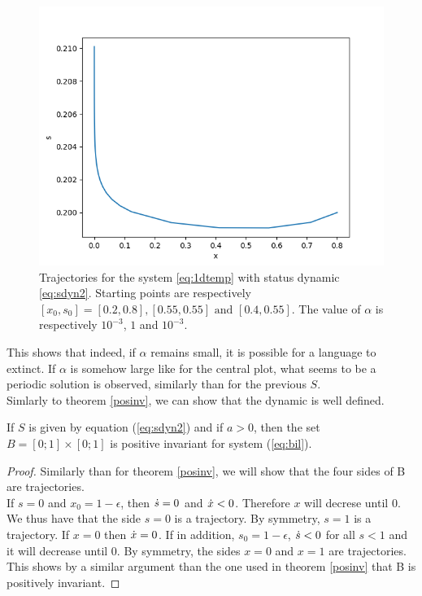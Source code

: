 \documentclass{article}
\begin{document}
\begin{figure}[H]
\includegraphics[scale=0.4]{traj1D208021e-3.png}
\caption{Trajectories for the system \ref{eq:1dtemp} with status dynamic \ref{eq:sdyn2}. Starting points are respectively $[x_0, s_0] = [0.2, 0.8], [0.55,0.55] \text{   and   } [0.4, 0.55]$. The value of $\alpha$ is respectively $10^{-3}$, $1$ and $10^{-3}$.}
\label{fig:traj1D2}
\end{figure}

This shows that indeed, if $\alpha$ remains small, it is possible for a language to extinct.
If $\alpha$ is somehow large like for the central plot, what seems to be a periodic solution is observed, similarly than for the previous $S$.\\
Simlarly to theorem \ref{posinv}, we can show that the dynamic is well defined. \\
\begin{theorem}{}
\label{posinv2}
If $S$ is given by equation (\ref{eq:sdyn2}) and if $a>0$, then the set $B = [0;1] \times [0;1]$ is positive invariant for system (\ref{eq:bil}).
\end{theorem}

\begin{proof}
Similarly than for theorem \ref{posinv}, we will show that the four sides of B are trajectories. \\
If $s = 0$ and $x_0 = 1-\epsilon$, then $\dot{s} = 0$ and $\dot{x} < 0$. Therefore $x$ will decrese until $0$.
We thus have that the side $s=0$ is a trajectory.
By symmetry, $s=1$ is a trajectory.
If $x=0$ then $\dot{x} = 0$. If in addition, $s_0 = 1-\epsilon$, $\dot{s} < 0$ for all $s < 1$ and it will decrease until $0$.
By symmetry, the sides $x=0$ and $x=1$ are trajectories.
This shows by a similar argument than the one used in theorem \ref{posinv} that  B is positively invariant.
\end{proof}
\end{document}
